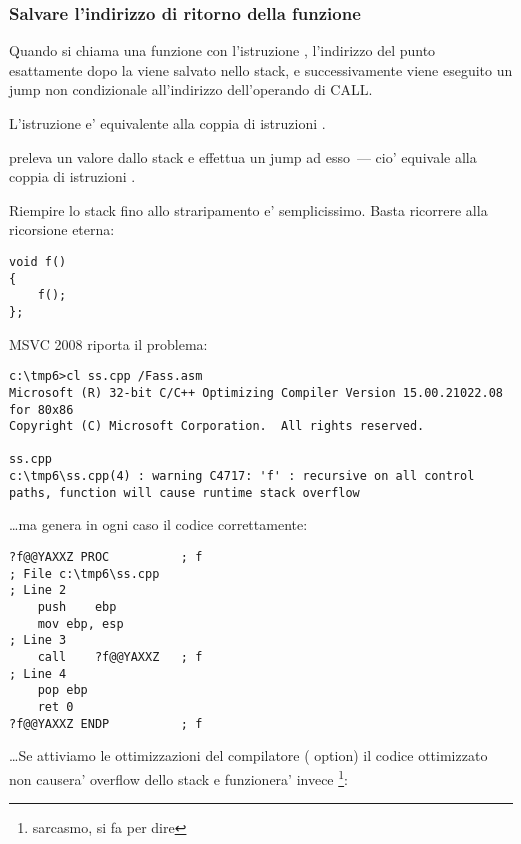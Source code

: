 \subsubsection{Salvare l'indirizzo di ritorno della funzione}


Quando si chiama una funzione con l'istruzione \CALL, l'indirizzo del punto esattamente dopo la \CALL viene salvato nello stack, e successivamente
viene eseguito un jump non condizionale all'indirizzo dell'operando di CALL.

L'istruzione \CALL e' equivalente alla coppia di istruzioni .

\RET preleva un valore dallo stack e effettua un jump ad esso~--- cio' equivale alla coppia di istruzioni .

\myindex{\Recursion}

Riempire lo stack fino allo straripamento e' semplicissimo. Basta ricorrere alla ricorsione eterna:

\begin{lstlisting}[style=customc]
void f()
{
	f();
};
\end{lstlisting}

MSVC 2008 riporta il problema:

\begin{lstlisting}
c:\tmp6>cl ss.cpp /Fass.asm
Microsoft (R) 32-bit C/C++ Optimizing Compiler Version 15.00.21022.08 for 80x86
Copyright (C) Microsoft Corporation.  All rights reserved.

ss.cpp
c:\tmp6\ss.cpp(4) : warning C4717: 'f' : recursive on all control paths, function will cause runtime stack overflow
\end{lstlisting}

\dots ma genera in ogni caso il codice correttamente:

\begin{lstlisting}[style=customasmx86]
?f@@YAXXZ PROC			; f
; File c:\tmp6\ss.cpp
; Line 2
	push	ebp
	mov	ebp, esp
; Line 3
	call	?f@@YAXXZ	; f
; Line 4
	pop	ebp
	ret	0
?f@@YAXXZ ENDP			; f
\end{lstlisting}

\dots Se attiviamo le ottimizzazioni del compilatore (\TT{\Ox} option) il codice ottimizzato non causera' overflow dello stack 
e funzionera' invece \footnote{sarcasmo, si fa per dire}:


